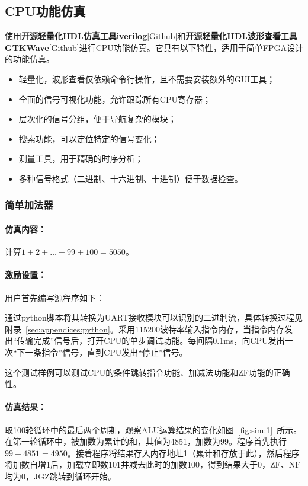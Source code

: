 \documentclass[lang=cn,a4paper,newtx]{elegantpaper}
\begin{document}
\subsection{CPU功能仿真}
使用\textbf{开源轻量化HDL仿真工具iverilog}[\href{https://github.com/steveicarus/iverilog}{Github}]和\textbf{开源轻量化HDL波形查看工具GTKWave}[\href{https://github.com/gtkwave/gtkwave}{Github}]进行CPU功能仿真。它具有以下特性，适用于简单FPGA设计的功能仿真。
\begin{itemize}
  \item 轻量化，波形查看仅依赖命令行操作，且不需要安装额外的GUI工具；
  \item  全面的信号可视化功能，允许跟踪所有CPU寄存器；
  \item 层次化的信号分组，便于导航复杂的模块；
  \item 搜索功能，可以定位特定的信号变化；
  \item 测量工具，用于精确的时序分析；
  \item 多种信号格式（二进制、十六进制、十进制）便于数据检查。
\end{itemize}
\subsubsection{简单加法器}
\label{sec:add_one_to_hundred}
\paragraph{仿真内容：}

计算$1+2+\dots +99 +100 =5050$。

\paragraph{激励设置：}

用户首先编写源程序如下：


通过python脚本将其转换为UART接收模块可以识别的二进制流，具体转换过程见附录~\ref{sec:appendices:python}。采用115200波特率输入指令内存，当指令内存发出“传输完成”信号后，打开CPU的单步调试功能。每间隔0.1ms，向CPU发出一次“下一条指令”信号，直到CPU发出“停止”信号。

这个测试样例可以测试CPU的条件跳转指令功能、加减法功能和ZF功能的正确性。
\paragraph{仿真结果：}
取100轮循环中的最后两个周期，观察ALU运算结果的变化如图~\ref{fig:sim:1}~所示。在第一轮循环中，被加数为累计的和，其值为4851，加数为99。程序首先执行$99 +4851 = 4950$。接着程序将结果存入内存地址1（累计和存放于此），然后程序将加数自增1后，加载立即数101并减去此时的加数100，得到结果大于0，ZF、NF均为0，JGZ跳转到循环开始。
\end{document}
